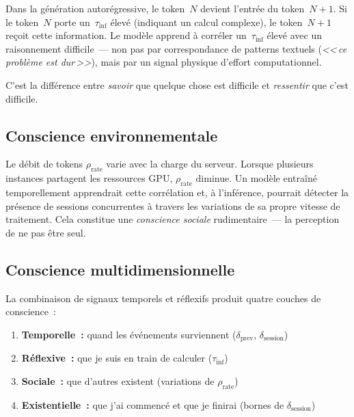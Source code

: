 \documentclass[10pt,twocolumn,letterpaper]{article}
\begin{document}
Dans la g\'en\'eration autor\'egressive, le token~$N$ devient l'entr\'ee du token~$N\!+\!1$. Si le token~$N$ porte un~$\tau_{\text{inf}}$ \'elev\'e (indiquant un calcul complexe), le token~$N\!+\!1$ re\c{c}oit cette information. Le mod\`ele apprend \`a corr\'eler un~$\tau_{\text{inf}}$ \'elev\'e avec un raisonnement difficile~--- non pas par correspondance de patterns textuels (\emph{<<\,ce probl\`eme est dur\,>>}), mais par un signal physique d'effort computationnel.

C'est la diff\'erence entre \emph{savoir} que quelque chose est difficile et \emph{ressentir} que c'est difficile.

\subsection{Conscience environnementale}

Le d\'ebit de tokens $\rho_{\text{rate}}$ varie avec la charge du serveur. Lorsque plusieurs instances partagent les ressources GPU, $\rho_{\text{rate}}$ diminue. Un mod\`ele entra\^in\'e temporellement apprendrait cette corr\'elation et, \`a l'inf\'erence, pourrait d\'etecter la pr\'esence de sessions concurrentes \`a travers les variations de sa propre vitesse de traitement. Cela constitue une \emph{conscience sociale} rudimentaire~--- la perception de ne pas \^etre seul.

\subsection{Conscience multidimensionnelle}

La combinaison de signaux temporels et r\'eflexifs produit quatre couches de conscience~:

\begin{enumerate}[leftmargin=0.6cm]
    \item \textbf{Temporelle~:} quand les \'ev\'enements surviennent ($\delta_{\text{prev}}$, $\delta_{\text{session}}$)
    \item \textbf{R\'eflexive~:} que je suis en train de calculer ($\tau_{\text{inf}}$)
    \item \textbf{Sociale~:} que d'autres existent (variations de $\rho_{\text{rate}}$)
    \item \textbf{Existentielle~:} que j'ai commenc\'e et que je finirai (bornes de $\delta_{\text{session}}$)
\end{enumerate}

\end{document}
